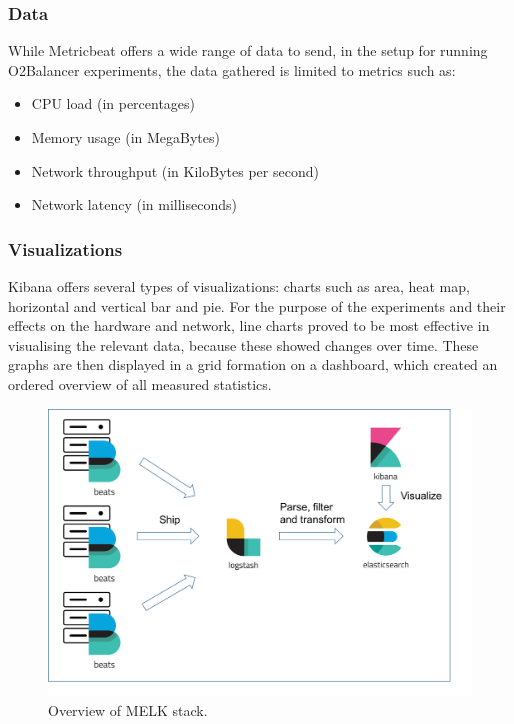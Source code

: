 \documentclass[]{article}
\begin{document}
\subsubsection{Data}
While Metricbeat offers a wide range of data to send, in the setup for running O2Balancer experiments, the data gathered is limited to metrics such as:
\begin{itemize}
	\itemsep 0em
	\item CPU load (in percentages)
	\item Memory usage (in MegaBytes)
	\item Network throughput (in KiloBytes per second)
	\item Network latency (in milliseconds)
\end{itemize}

\subsubsection{Visualizations}
Kibana offers several types of visualizations: charts such as area, heat map, horizontal and vertical bar and pie. For the purpose of the experiments and their effects on the hardware and network, line charts proved to be most effective in visualising the relevant data, because these showed changes over time.
These graphs are then displayed in a grid formation on a dashboard, which created an ordered overview of all measured statistics.

\begin{center}
	\begin{figure}[H]
		\includegraphics[width=\textwidth]{images/melk}
		\caption{Overview of MELK stack.}
		\label{fig:ssh}
	\end{figure}
\end{center}
\end{document}
